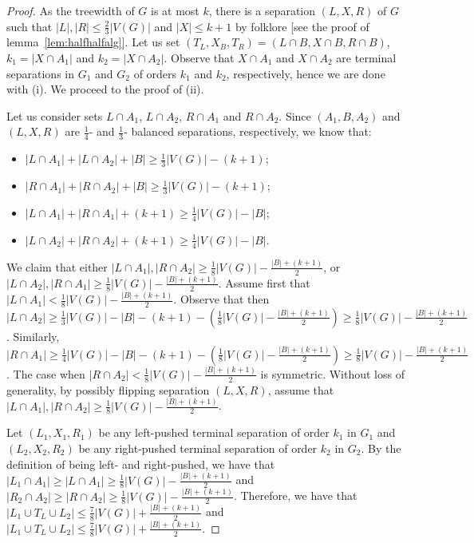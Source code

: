 \documentclass[a4paper,11pt]{article}
\theoremstyle{definition}
\theoremstyle{remark}
\begin{document}
\begin{proof}
  As the treewidth of $G$ is at most $k$, there is a separation
  $(L,X,R)$ of $G$ such that $|L|,|R|\leq \frac{2}{3} |V(G)|$ and $|X|\leq k+1$ 
  by folklore [see the proof of lemma~\ref{lem:halfhalfalg}].  Let us set 
  $(T_L,X_B,T_R)=(L\cap B, X\cap B, R\cap B)$,
  $k_1=|X\cap A_1|$ and $k_2=|X\cap A_2|$.  Observe that $X\cap A_1$
  and $X\cap A_2$ are terminal separations in $G_1$ and $G_2$ of
  orders $k_1$ and $k_2$, respectively, hence we are done with (i).
  We proceed to the proof of (ii).
  
  Let us consider sets $L\cap A_1$, $L\cap A_2$, $R\cap A_1$ and $R\cap A_2$.
  Since $(A_1,B,A_2)$ and $(L,X,R)$ are $\frac{1}{4}$- and
  $\frac{1}{3}$- balanced separations, respectively, we know that:
  \begin{itemize}
  \item $|L\cap A_1|+|L\cap A_2|+|B|\geq \frac{1}{3}|V(G)|-(k+1)$;
  \item $|R\cap A_1|+|R\cap A_2|+|B|\geq \frac{1}{3}|V(G)|-(k+1)$;
  \item $|L\cap A_1|+|R\cap A_1|+(k+1)\geq \frac{1}{4}|V(G)|-|B|$;
  \item $|L\cap A_2|+|R\cap A_2|+(k+1)\geq \frac{1}{4}|V(G)|-|B|$.
  \end{itemize}
  We claim that either $|L\cap A_1|,|R\cap A_2|\geq
  \frac{1}{8}|V(G)|-\frac{|B|+(k+1)}{2}$, or $|L\cap A_2|,|R\cap A_1|\geq
  \frac{1}{8}|V(G)|-\frac{|B|+(k+1)}{2}$.  Assume first that $|L\cap
  A_1|<\frac{1}{8}|V(G)|-\frac{|B|+(k+1)}{2}$.  Observe that then $|L\cap
  A_2|\geq
  \frac{1}{3}|V(G)|-|B|-(k+1)-(\frac{1}{8}|V(G)|-\frac{|B|+(k+1)}{2})\geq
  \frac{1}{8}|V(G)|-\frac{|B|+(k+1)}{2}$.  Similarly, $|R\cap A_1|\geq
  \frac{1}{4}|V(G)|-|B|-(k+1)-(\frac{1}{8}|V(G)|-\frac{|B|+(k+1)}{2})\geq
  \frac{1}{8}|V(G)|-\frac{|B|+(k+1)}{2}$.  The case when $|R\cap
  A_2|<\frac{1}{8}|V(G)|-\frac{|B|+(k+1)}{2}$ is symmetric.  Without loss
  of generality, by possibly flipping separation $(L,X,R)$, assume
  that $|L\cap A_1|,|R\cap A_2|\geq \frac{1}{8}|V(G)|-\frac{|B|+(k+1)}{2}$.
  
  Let $(L_1,X_1,R_1)$ be any left-pushed terminal separation of order
  $k_1$ in $G_1$ and $(L_2,X_2,R_2)$ be any right-pushed terminal
  separation of order $k_2$ in $G_2$.  By the definition of being
  left- and right-pushed, we have that $|L_1\cap A_1|\geq |L\cap
  A_1|\geq \frac{1}{8}|V(G)|-\frac{|B|+(k+1)}{2}$ and $|R_2\cap A_2|\geq
  |R\cap A_2|\geq \frac{1}{8}|V(G)|-\frac{|B|+(k+1)}{2}$.  Therefore, we
  have that $|L_1\cup T_L\cup L_2|\leq
  \frac{7}{8}|V(G)|+\frac{|B|+(k+1)}{2}$ and $|L_1\cup T_L\cup L_2|\leq
  \frac{7}{8}|V(G)|+\frac{|B|+(k+1)}{2}$.
\end{proof}
\end{document}
